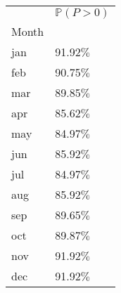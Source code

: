 \begin{tabular}{ll}
\toprule
{} & $\mathbb{P}(P > 0)$ \\
Month &                     \\
\midrule
jan   &           91.92$\%$ \\
feb   &           90.75$\%$ \\
mar   &           89.85$\%$ \\
apr   &           85.62$\%$ \\
may   &           84.97$\%$ \\
jun   &           85.92$\%$ \\
jul   &           84.97$\%$ \\
aug   &           85.92$\%$ \\
sep   &           89.65$\%$ \\
oct   &           89.87$\%$ \\
nov   &           91.92$\%$ \\
dec   &           91.92$\%$ \\
\bottomrule
\end{tabular}
